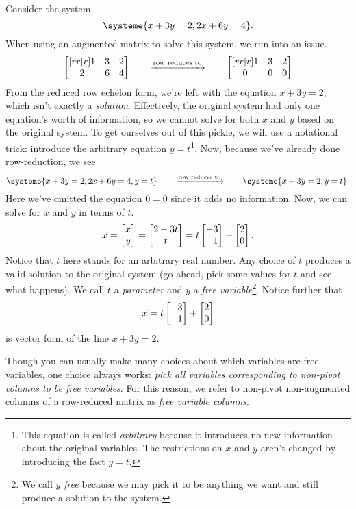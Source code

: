 	Consider the system
	\begin{equation}
		\label{EQFREEVAR}
		\systeme{x+3y=2,2x+6y=4}.
	\end{equation}
	When using an augmented matrix to solve this system, we run into an issue.
	\[
			\begin{bmatrix}[rr|r]
				1&3 & 2\\
				2&6&4\\
			\end{bmatrix}
			\qquad\xrightarrow{\text{row reduces to}}\qquad
			\begin{bmatrix}[rr|r]
				1&3&2\\
				0&0&0\\
			\end{bmatrix}
	\]
	From the reduced row echelon form, we're left with the equation $x+3y=2$, which isn't exactly
	a \emph{solution}. Effectively, the original system had only one equation's worth of information,
	so we cannot solve for both $x$ and $y$ based on the original system. To get ourselves out of
	this pickle, we will use a notational trick: introduce the arbitrary equation $y=t$\footnote{ This equation
	is called \emph{arbitrary} because it introduces no new information about the original variables. The restrictions
	on $x$ and $y$ aren't changed by introducing the fact $y=t$.}.
	Now, because we've already done row-reduction, we see
	\[
		\systeme{x+3y=2,2x+6y=4,y=t}\qquad\Rrefto\qquad
		\systeme{x+3y=2,y=t}.
	\]
	Here we've omitted the equation $0=0$ since it adds no information.
	Now, we can solve for $x$ and $y$ in terms of $t$.
	\[
		\vec x=\mat{x\\y} = \matc{2-3t\\t}=t\mat{-3\\1}+\mat{2\\0}.
	\]
	Notice that $t$ here stands for an arbitrary real number. Any choice of $t$
	produces a valid solution to the original system (go ahead, pick some values
	for $t$ and see what happens).  We call $t$ a \emph{parameter} and $y$ a
	\emph{free variable}\footnote{ We call $y$ \emph{free} because we may pick
	it to be anything we want and still produce a solution to the system.}.
	Notice further that 
	\[
		\vec x=t\mat{-3\\1}+\mat{2\\0}
	\]
	is vector form of the line $x+3y=2$.

	\medskip
	Though you can usually make many choices about which variables are free variables, one choice always works:
	\emph{pick all variables corresponding to non-pivot columns to be free variables}. For this reason,
	we refer to non-pivot non-augmented columns of a row-reduced matrix as \emph{free variable columns}.

